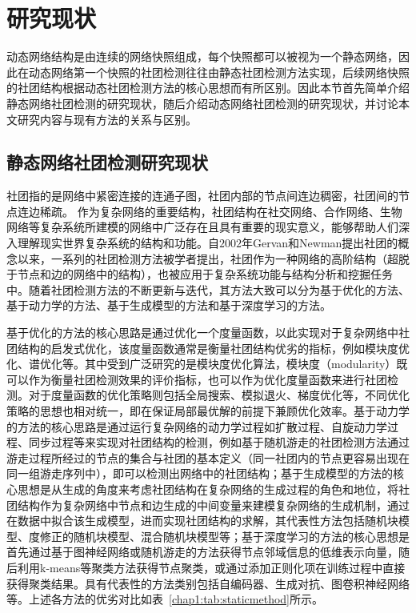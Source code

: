\section{研究现状}


动态网络结构是由连续的网络快照组成，每个快照都可以被视为一个静态网络，因此在动态网络第一个快照的社团检测往往由静态社团检测方法实现，后续网络快照的社团结构根据动态社团检测方法的核心思想而有所区别。因此本节首先简单介绍静态网络社团检测的研究现状，随后介绍动态网络社团检测的研究现状，并讨论本文研究内容与现有方法的关系与区别。
\subsection{静态网络社团检测研究现状}

社团指的是网络中紧密连接的连通子图，社团内部的节点间连边稠密，社团间的节点连边稀疏。
作为复杂网络的重要结构，社团结构在社交网络、合作网络、生物网络等复杂系统所建模的网络中广泛存在且具有重要的现实意义，能够帮助人们深入理解现实世界复杂系统的结构和功能\cite{peng2024unsupervised}。自$2002$年Gervan和Newman提出社团的概念以来\cite{girvan2002community}，一系列的社团检测方法被学者提出，社团作为一种网络的高阶结构（超脱于节点和边的网络中的结构），也被应用于复杂系统功能与结构分析和挖掘任务中。随着社团检测方法的不断更新与迭代，其方法大致可以分为基于优化的方法、基于动力学的方法、基于生成模型的方法和基于深度学习的方法\cite{fortunato2016community,jin2021survey}。

基于优化的方法的核心思路是通过优化一个度量函数，以此实现对于复杂网络中社团结构的启发式优化，该度量函数通常是衡量社团结构优劣的指标，例如模块度优化、谱优化等。其中受到广泛研究的是模块度优化算法\cite{zhang2009modularity}，模块度（modularity）既可以作为衡量社团检测效果的评价指标，也可以作为优化度量函数来进行社团检测。对于度量函数的优化策略则包括全局搜索、模拟退火、梯度优化等\cite{zhang2014scalable,lee2012modularity,JSJA20241121007}，不同优化策略的思想也相对统一，即在保证局部最优解的前提下兼顾优化效率。基于动力学的方法的核心思路是通过运行复杂网络的动力学过程如扩散过程\cite{jeub2015think}、自旋动力学过程\cite{traag2011narrow}、同步过程\cite{boccaletti2007detecting}等来实现对社团结构的检测，例如基于随机游走的社团检测方法\cite{pons2006computing,JSJA201912008}通过游走过程所经过的节点的集合与社团的基本定义（同一社团内的节点更容易出现在同一组游走序列中），即可以检测出网络中的社团结构；基于生成模型的方法的核心思想是从生成的角度来考虑社团结构在复杂网络的生成过程的角色和地位，将社团结构作为复杂网络中节点和边生成的中间变量来建模复杂网络的生成机制，通过在数据中拟合该生成模型，进而实现社团结构的求解，其代表性方法包括随机块模型\cite{Huang02072024}、度修正的随机块模型\cite{karrer2011stochastic}、混合随机块模型\cite{zhang2020struct}等；基于深度学习的方法的核心思想是首先通过基于图神经网络或随机游走的方法获得节点邻域信息的低维表示向量，随后利用k-means等聚类方法获得节点聚类，或通过添加正则化项在训练过程中直接获得聚类结果。具有代表性的方法类别包括自编码器\cite{sun2020network}、生成对抗\cite{zhang2020seal}、图卷积神经网络\cite{he2021community}等。上述各方法的优劣对比如表~\ref{chap1:tab:staticmethod}所示。

